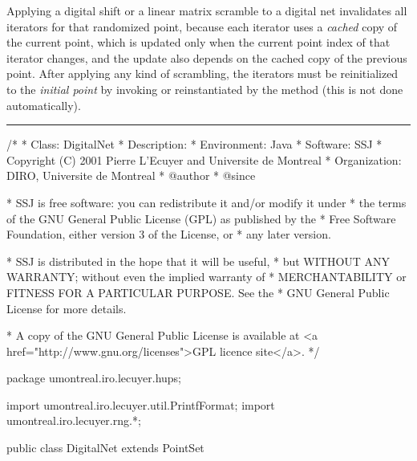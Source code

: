 Applying a digital shift or a linear matrix scramble to a digital net
invalidates all iterators for that randomized point,
because each iterator uses a
\emph{cached} copy of the current point, which is updated only when
the current point index of that iterator changes, and the update also
depends on the cached copy of the previous point.
After applying any kind of scrambling, the iterators must be
reinitialized to the \emph{initial point} by invoking
or reinstantiated by the  method
(this is not done automatically).


\bigskip\hrule\bigskip

\begin{code}
\begin{hide}
/*
 * Class:        DigitalNet
 * Description:  
 * Environment:  Java
 * Software:     SSJ 
 * Copyright (C) 2001  Pierre L'Ecuyer and Universite de Montreal
 * Organization: DIRO, Universite de Montreal
 * @author       
 * @since

 * SSJ is free software: you can redistribute it and/or modify it under
 * the terms of the GNU General Public License (GPL) as published by the
 * Free Software Foundation, either version 3 of the License, or
 * any later version.

 * SSJ is distributed in the hope that it will be useful,
 * but WITHOUT ANY WARRANTY; without even the implied warranty of
 * MERCHANTABILITY or FITNESS FOR A PARTICULAR PURPOSE.  See the
 * GNU General Public License for more details.

 * A copy of the GNU General Public License is available at
   <a href="http://www.gnu.org/licenses">GPL licence site</a>.
 */
\end{hide}
package umontreal.iro.lecuyer.hups;\begin{hide}

import umontreal.iro.lecuyer.util.PrintfFormat;
import umontreal.iro.lecuyer.rng.*;
\end{hide}

public class DigitalNet extends PointSet \begin{hide} {

}
\end{hide}
\end{code}
